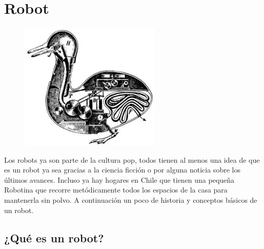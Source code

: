 


\chapter{Robot} %

\label{Chapter2} %




\begin{figure}[htbp]
	\centering
		\includegraphics[width=0.6\textwidth]{./Figures/Duck_of_Vaucanson.jpg}
	\label{fig:Duck}
\end{figure}

Los robots ya son parte de la cultura pop, todos tienen al menos una idea de que es un robot ya sea gracias a la ciencia ficción o por alguna noticia sobre los últimos avances. Incluso ya hay hogares en Chile que tienen una pequeña Robotina que recorre metódicamente todos los espacios de la casa para mantenerla sin polvo. A continuación un poco de historia y conceptos básicos de un robot.

\section{¿Qué es un robot?}

